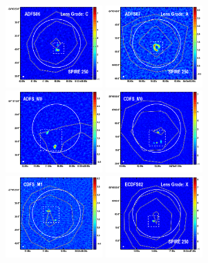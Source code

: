 \documentclass[iop]{emulateapj}
\begin{document}
\begin{figure}[!tbp]
\begin{centering}
\includegraphics[width=0.331\textwidth]{../Figures/overlays/ADFS06_870_250.pdf}
\includegraphics[width=0.331\textwidth]{../Figures/overlays/ADFS07_870_250.pdf}
\includegraphics[width=0.331\textwidth]{../Figures/overlays/ADFS_M0_870_250.pdf}
\includegraphics[width=0.331\textwidth]{../Figures/overlays/CDFS_M0_870_250.pdf}
\includegraphics[width=0.331\textwidth]{../Figures/overlays/CDFS_M1_870_250.pdf}
\includegraphics[width=0.331\textwidth]{../Figures/overlays/ECDFS02_870_250.pdf}

\end{centering}
\end{figure}
\end{document}
